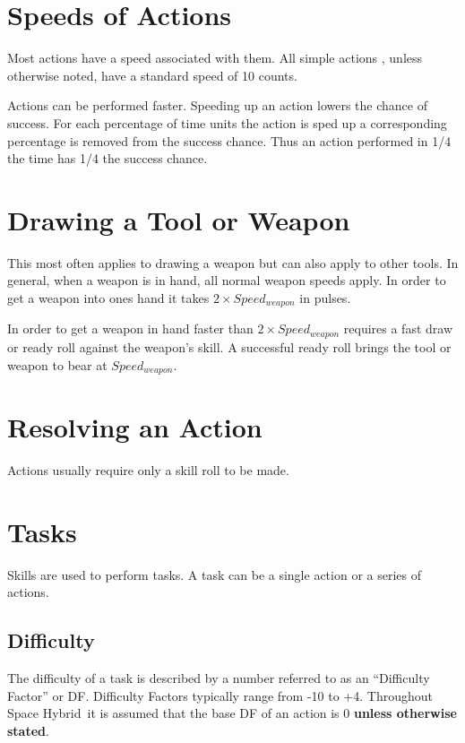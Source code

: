 \section{Speeds of Actions}

Most actions have a speed associated with them. All simple actions 
, unless otherwise noted, have a standard speed of 10 counts. 
 


Actions can be performed faster. Speeding up an action lowers the
chance of success. For each percentage of time units the action is 
sped up a corresponding percentage is removed from 
the success chance. Thus an action performed in 1/4 the time has
1/4 the success chance.

\section{Drawing a Tool or Weapon}

This most often applies to drawing a weapon but can also apply to 
other tools. In general, when a weapon is in hand, all normal weapon 
speeds apply. In order to get a weapon into ones hand it takes 
\( 2 \times Speed_{weapon} \) in pulses. 

In order to get a weapon in hand faster than \( 2 \times 
Speed_{weapon} \) requires a fast draw or ready roll against the weapon's 
skill. A successful ready roll brings the tool or weapon to bear at 
\( Speed_{weapon} \).  

\section{Resolving an Action}
Actions usually require only a skill roll to be made. 

\section{Tasks}

Skills are used to perform tasks. A task can be a single action or a
series of actions. 

\subsection{Difficulty}

The difficulty of a task is described by a number 
referred to as an ``Difficulty Factor'' or DF. Difficulty Factors 
typically range from -10  to +4. Throughout Space Hybrid\ it is assumed that the 
base DF of an action is 0 {\bf unless otherwise stated}. 

